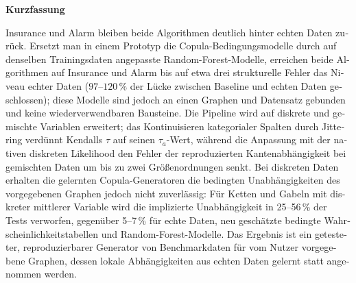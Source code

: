 \documentclass[
  english,
  class=report,
  accentcolor=2c,
  marginpar=false,
  parskip=half-,
  fontsize=11pt,
  ruledheaders=false,
  pdfa=false,
  IMRAD=false,
  thesis={type=master}
]{tudapub}
\newenvironment{centeredabstract}[1][Abstract]{%
  \clearpage
  \thispagestyle{empty}
  \begin{center}
    {\Large \bfseries #1}\\[1em]
    \begin{minipage}{0.8\textwidth}
      \normalsize
}{%
    \end{minipage}
  \end{center}
  \clearpage
}
\begin{document}
\begin{centeredabstract}[Kurzfassung]
\begin{otherlanguage}{german}
Insurance und Alarm bleiben beide Algorithmen deutlich hinter echten Daten
zur\"uck. Ersetzt man in einem Prototyp die Copula-Bedingungsmodelle durch
auf denselben Trainingsdaten angepasste Random-Forest-Modelle, erreichen
beide Algorithmen auf Insurance und Alarm bis auf etwa drei strukturelle
Fehler das Niveau echter Daten
($97$--$120\,\%$ der L\"ucke zwischen Baseline und echten Daten
geschlossen); diese Modelle sind jedoch an einen Graphen und Datensatz
gebunden und keine wiederverwendbaren Bausteine. Die Pipeline
wird auf diskrete und gemischte Variablen erweitert; das Kontinuisieren
kategorialer Spalten durch Jittering verd\"unnt Kendalls $\tau$ auf seinen
$\tau_a$-Wert, w\"ahrend die Anpassung mit der nativen diskreten Likelihood
den Fehler der reproduzierten Kantenabh\"angigkeit bei gemischten Daten um
bis zu zwei Gr\"o{\ss}enordnungen senkt. Bei diskreten Daten erhalten die
gelernten Copula-Generatoren die bedingten Unabh\"angigkeiten des vorgegebenen Graphen
jedoch nicht zuverl\"assig: F\"ur Ketten und Gabeln mit diskreter mittlerer
Variable wird die implizierte Unabh\"angigkeit in 25--56\,\% der Tests
verworfen, gegen\"uber 5--7\,\% f\"ur echte Daten, neu gesch\"atzte bedingte
Wahrscheinlichkeitstabellen und Random-Forest-Modelle. Das Ergebnis ist ein getesteter,
reproduzierbarer Generator von Benchmarkdaten f\"ur vom Nutzer vorgegebene
Graphen, dessen lokale Abh\"angigkeiten aus echten Daten gelernt statt
angenommen werden.
\end{otherlanguage}
\end{centeredabstract}


\tableofcontents
\listoffigures
\listoftables
\listofalgorithms
\end{document}
